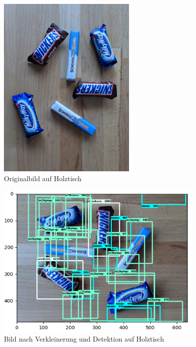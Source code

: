     
    
    \begin{figure}[htbp]
        \centering
        \includegraphics[width = 0.6\textwidth]{Bilder/misc/on_wood.jpg}
        \caption{Originalbild auf Holztisch}
        \label{fig:on_wood}
    \end{figure}
    
    \begin{figure}[htbp]
        \vspace{-1cm}
        \centering
        \includegraphics[width = 0.9\textwidth]{Bilder/misc/detection_on_wood.png}
        \caption{Bild nach Verkleinerung und Detektion auf Holztisch}
        \label{fig:det_on_wood}
    \end{figure}
    
